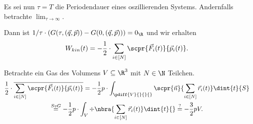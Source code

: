 \documentclass[../WiSe22ANA3.tex]{subfiles}
\begin{document}
			\begin{Annahme}
				Es sei nun $\tau=T$ die Periodendauer eines oszillierenden Systems. Andernfalls betrachte $\lim_{\tau\to\infty}$. 
			\end{Annahme}
			Dann ist $1/\tau\cdot(G(\tau,(\vec q,\vec p))-G(0,(\vec q,\vec p)))=0_\R$ und wir erhalten
			\begin{align*}
				W_{kin}(t)=-\frac{1}{2}\cdot \sum_{i\in[N]}\scpr{\vec F_i(t)}{\vec p_i(t)}. 
			\end{align*}
			\begin{bsp}
				Betrachte ein Gas des Volumens $V\subseteq\R^3$ mit $N\in\N$ Teilchen.
				\begin{multline*}
					\frac{1}{2}\cdot\overline{\sum_{i\in[N]}\scpr{\vec F_i(t)}{\vec p_i(t)}}=-\frac{1}{2}p\cdot\int_{\pdiff{V}{}{}{}}\scpr{\vec n}{\sum_{i\in[N]}\vec r_i(t)}\dint{t}{S}\\
					\stackrel{SvG}{=}-\frac{1}{2}p\cdot\int_{V}\div\nbra{\sum_{i\in[N]}\vec r_i(t)}\dint{t}{}\stackrel{?}{=}-\frac{3}{2}pV.
				\end{multline*}
			\end{bsp}
\end{document}

